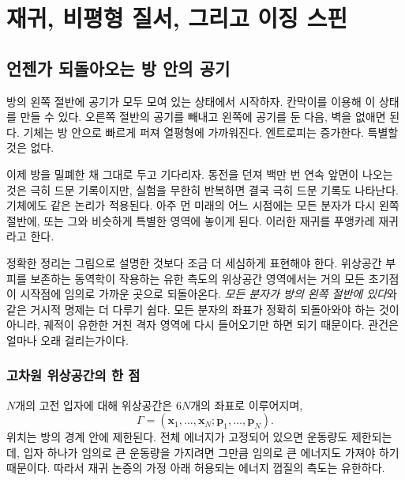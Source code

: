 \chapter{재귀, 비평형 질서, 그리고 이징 스핀}


\section{언젠가 되돌아오는 방 안의 공기}

방의 왼쪽 절반에 공기가 모두 모여 있는 상태에서 시작하자. 칸막이를 이용해 이 상태를 만들 수 있다. 오른쪽 절반의 공기를 빼내고 왼쪽에 공기를 둔 다음, 벽을 없애면 된다. 기체는 방 안으로 빠르게 퍼져 열평형에 가까워진다. 엔트로피는 증가한다. 특별할 것은 없다.

이제 방을 밀폐한 채 그대로 두고 기다리자. 동전을 던져 백만 번 연속 앞면이 나오는 것은 극히 드문 기록이지만, 실험을 무한히 반복하면 결국 극히 드문 기록도 나타난다. 기체에도 같은 논리가 적용된다. 아주 먼 미래의 어느 시점에는 모든 분자가 다시 왼쪽 절반에, 또는 그와 비슷하게 특별한 영역에 놓이게 된다. 이러한 재귀를 푸앵카레 재귀라고 한다.

정확한 정리는 그림으로 설명한 것보다 조금 더 세심하게 표현해야 한다. 위상공간 부피를 보존하는 동역학이 작용하는 유한 측도의 위상공간 영역에서는 거의 모든 초기점이 시작점에 임의로 가까운 곳으로 되돌아온다. \emph{모든 분자가 방의 왼쪽 절반에 있다}와 같은 거시적 명제는 더 다루기 쉽다. 모든 분자의 좌표가 정확히 되돌아와야 하는 것이 아니라, 궤적이 유한한 거친 격자 영역에 다시 들어오기만 하면 되기 때문이다. 관건은 얼마나 오래 걸리는가이다.

\subsection{고차원 위상공간의 한 점}

\(N\)개의 고전 입자에 대해 위상공간은 \(6N\)개의 좌표로 이루어지며,
\begin{equation}
 \Gamma=(\bm x_1,\ldots,\bm x_N;\bm p_1,\ldots,\bm p_N).
 \label{eq:sm8-phase-point}
\end{equation}
위치는 방의 경계 안에 제한된다. 전체 에너지가 고정되어 있으면 운동량도 제한되는데, 입자 하나가 임의로 큰 운동량을 가지려면 그만큼 임의로 큰 에너지도 가져야 하기 때문이다. 따라서 재귀 논증의 가정 아래 허용되는 에너지 껍질의 측도는 유한하다.

